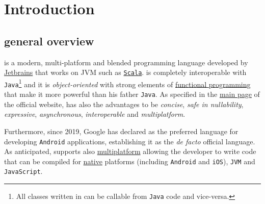 \section{Introduction}

\subsection{\Kotlin general overview}

\Kotlin is a modern, multi-platform and blended programming language developed by \href{https://www.jetbrains.com/}{Jetbrains} that works on JVM such as \href{www.scala-lang.org}{\texttt{Scala}}.
\Kotlin is completely interoperable with \texttt{Java}\footnote{All classes written in \Kotlin can be callable from \texttt{Java} code and vice-versa.} and it is \textit{object-oriented} with strong elements of \href{https://en.wikipedia.org/wiki/Functional_programming}{functional programming} that make it more powerful than his father \texttt{Java}.
As specified in the \href{https://kotlinlang.org/#why-kotlin}{main page} of the official website, \Kotlin has also the advantages to be \textit{concise}, \textit{safe in nullability}, \textit{expressive}, \textit{asynchronous}, \textit{interoperable} and \textit{multiplatform}.

Furthermore, since 2019, Google has declared \Kotlin as the preferred language for developing \texttt{Android} applications, establishing it as the \textit{de facto} official language. As anticipated, \Kotlin supports also \href{https://kotlinlang.org/docs/multiplatform.html}{multiplatform} allowing the developer to write \Kotlin code that can be compiled for \href{https://kotlinlang.org/docs/native-overview.html}{native} platforms (including \texttt{Android} and \texttt{iOS}), \texttt{JVM} and \texttt{JavaScript}.\\

